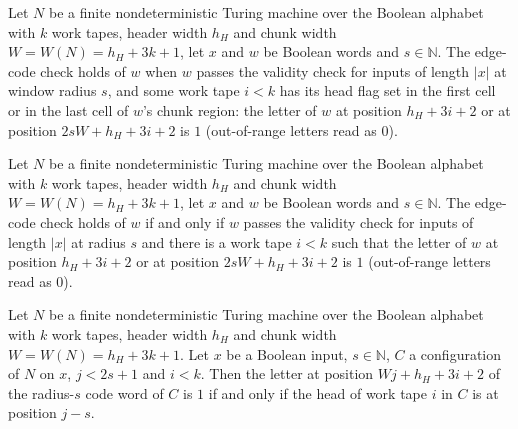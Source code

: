 \begin{definition}
\label{Complexity.Codec.EdgeChk}
\leanok
{}
Let $N$ be a finite nondeterministic Turing machine over the Boolean alphabet with $k$ work tapes, header width $h_H$ and chunk width $W=W(N)=h_H+3k+1$, let $x$ and $w$ be Boolean
words and $s\in\mathbb N$. The edge-code check holds of $w$ when $w$ passes the validity check
for inputs of length $|x|$ at window radius $s$, and some work tape $i<k$ has its head flag set
in the first cell or in the last cell of $w$'s chunk region: the letter of $w$ at position
$h_H+3i+2$ or at position $2sW+h_H+3i+2$ is $1$ (out-of-range letters read as $0$).
\end{definition}

\begin{lemma}
\label{Complexity.Codec.edgeChk_def}
\leanok
{}
Let $N$ be a finite nondeterministic Turing machine over the Boolean alphabet with $k$ work tapes, header width $h_H$ and chunk width $W=W(N)=h_H+3k+1$, let $x$ and
$w$ be Boolean words and $s\in\mathbb N$. The edge-code check holds of $w$ if and only if $w$
passes the validity check for inputs of length $|x|$ at radius $s$ and there is a work tape
$i<k$ such that the letter of $w$ at position $h_H+3i+2$ or at position $2sW+h_H+3i+2$ is $1$
(out-of-range letters read as $0$).
\end{lemma}

\begin{lemma}
\label{Complexity.Codec.getD_cfgWord_head}
\leanok
{}
Let $N$ be a finite nondeterministic Turing machine over the Boolean alphabet with $k$ work tapes, header width $h_H$ and chunk width $W=W(N)=h_H+3k+1$.
Let $x$ be a Boolean input, $s\in\mathbb N$, $C$ a configuration of $N$ on $x$, $j<2s+1$ and
$i<k$. Then the letter at position $Wj+h_H+3i+2$ of the radius-$s$ code word of $C$ is $1$ if
and only if the head of work tape $i$ in $C$ is at position $j-s$.
\end{lemma}

